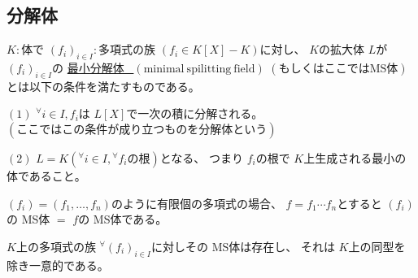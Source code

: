 \documentclass[../master_galois_theory]{subfiles}
\begin{document}
\subsection{分解体}

\begin{defi}
  $K:$体で $(f_i)_{i \in I}:$多項式の族 $(f_i \in K[X] - K)$に対し、
  $K$の拡大体 $L$が $(f_i)_{i \in I}$の
  \underline{最小分解体 \  $(\mathrm{minimal \  spilitting \  field})$}
  $(もしくはここでは \mathrm{MS}体)$とは以下の条件を満たすものである。

  $(1)$
  ${}^\forall i \in I , f_i$は $L[X]$で一次の積に分解される。
  $(ここではこの条件が成り立つものを分解体という)$

  $(2)$
  $L = K({}^\forall i \in I , {}^\forall f_i の根)$となる、
  つまり $f_i$の根で $K$上生成される最小の体であること。
\end{defi}

\begin{rem}
  $(f_i) = (f_1 , \dots , f_n)$のように有限個の多項式の場合、
  $f = f_1 \cdots f_n$とすると
  $(f_i)$の \rm{MS}体 $=$ $f$の \rm{MS}体である。
\end{rem}

\begin{prop}
  $K$上の多項式の族 ${}^\forall (f_i)_{i \in I}$に対しその \rm{MS}体は存在し、
  それは $K$上の同型を除き一意的である。
\end{prop}
\end{document}
